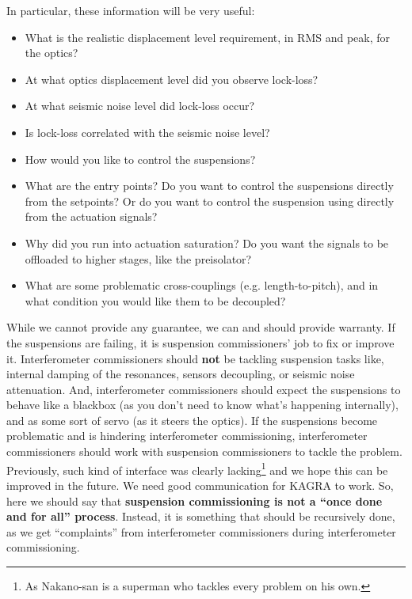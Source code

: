 In particular, these information will be very useful:
\begin{itemize}
	\item What is the realistic displacement level requirement, in RMS and peak, for the optics?
	\item At what optics displacement level did you observe lock-loss?
	\item At what seismic noise level did lock-loss occur?
	\item Is lock-loss correlated with the seismic noise level?
	\item How would you like to control the suspensions?
	\item What are the entry points? Do you want to control the suspensions directly from the setpoints? Or do you want to control the suspension using directly from the actuation signals?
	\item Why did you run into actuation saturation? Do you want the signals to be offloaded to higher stages, like the preisolator?
	\item What are some problematic cross-couplings (e.g. length-to-pitch), and in what condition you would like them to be decoupled?
\end{itemize}

While we cannot provide any guarantee, we can and should provide warranty.
If the suspensions are failing, it is suspension commissioners' job to fix or improve it.
Interferometer commissioners should \textbf{not} be tackling suspension tasks like, internal damping of the resonances, sensors decoupling, or seismic noise attenuation.
And, interferometer commissioners should expect the suspensions to behave like a blackbox (as you don't need to know what's happening internally), and as some sort of servo (as it steers the optics).
If the suspensions become problematic and is hindering interferometer commissioning, interferometer commissioners should work with suspension commissioners to tackle the problem.
Previously, such kind of interface was clearly lacking\footnote{As Nakano-san is a superman who tackles every problem on his own.} and we hope this can be improved in the future.
We need good communication for KAGRA to work.
So, here we should say that \textbf{suspension commissioning is not a ``once done and for all'' process}.
Instead, it is something that should be recursively done, as we get ``complaints'' from interferometer commissioners during interferometer commissioning.


